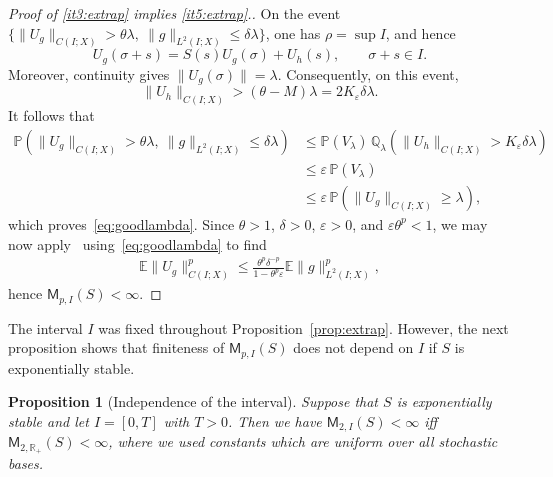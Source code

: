 \documentclass[11pt]{amsart}
\newtheorem{proposition}[theorem]{Proposition}
\theoremstyle{definition}
\theoremstyle{remark}
\numberwithin{equation}{section}
\newcommand{\E}{\mathbb E}
\renewcommand{\P}{\mathbb P}
\newcommand{\R}{\mathbb R}
\newcommand{\1}{\mathbf 1}
\newcommand{\cM}{\mathsf{M}}
\newcommand{\norm}[1]{\lVert #1\rVert}
\begin{document}
\begin{proof}[Proof of \ref{it3:extrap} implies \ref{it5:extrap}.]
On the event $\{\norm{U_g}_{C(I;X)}>\theta\lambda,\ \|g\|_{L^2(I;X)}\leq\delta\lambda\}$, one has $\rho = \sup I$, and hence
\[
    U_g(\sigma+s)=S(s)U_g(\sigma)+U_h(s),
    \qquad \sigma+s\in I.
\]
Moreover, continuity gives $\norm{U_g(\sigma)}=\lambda$.
Consequently, on this event,
\[
    \norm{U_h}_{C(I;X)}
    >(\theta-M)\lambda
    =2K_\varepsilon\delta\lambda.
\]
It follows that
\[
    \begin{aligned}
    \P(\norm{U_g}_{C(I;X)}>\theta\lambda,\ \|g\|_{L^2(I;X)}\leq\delta\lambda)
    &\leq \P(V_\lambda)\,
        \mathbb Q_\lambda\left(
            \norm{U_h}_{C(I;X)}
            >K_\varepsilon\delta\lambda
        \right)\\ &\leq\varepsilon\,\P(V_\lambda)\\ &\leq\varepsilon\,\P(\norm{U_g}_{C(I;X)}\geq\lambda),
    \end{aligned}
\]
which proves~\eqref{eq:goodlambda}.
Since $\theta > 1$, $\delta > 0$, $\varepsilon > 0$, and $\varepsilon \theta^p < 1$, we may now apply~\cite[Lemma 7.1]{Burkholder1973} using~\eqref{eq:goodlambda} to find
\begin{align}
    \E\norm{U_g}_{C(I;X)}^p \leq \frac{\theta^p \delta^{-p}}{1 - \theta^p \varepsilon} \E \norm{g}_{L^2(I;X)}^p,
\end{align}
hence $\cM_{p,I}(S) < \infty$.
\end{proof}

The interval $I$ was fixed throughout Proposition~\ref{prop:extrap}.
However, the next proposition shows that finiteness of $\cM_{p,I}(S)$ does not depend on $I$ if $S$ is exponentially stable.

\begin{proposition}[Independence of the interval]
    \label{prop:indepinterval}
    Suppose that $S$ is exponentially stable and let $I = [0,T]$ with $T > 0$. 
    Then we have $\cM_{2,I}(S) < \infty$ iff $\cM_{2,\R_+}(S) < \infty$, where we used constants which are uniform over all stochastic bases. 
\end{proposition}
\end{document}
